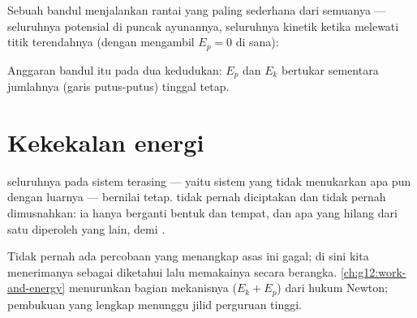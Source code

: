 Sebuah bandul menjalankan rantai yang paling sederhana dari semuanya
--- seluruhnya potensial di puncak ayunannya, seluruhnya kinetik ketika
melewati titik terendahnya (dengan mengambil $E_p = 0$ di sana):

\begin{omfigure}
\qquad
{}

{\small Anggaran bandul itu pada dua kedudukan: $E_p$ dan $E_k$
bertukar sementara jumlahnya (garis putus-putus) tinggal tetap.}
\end{omfigure}

\section{Kekekalan energi}

\begin{theorem}\label{thm:g10:energy-conservation:conservation}
 seluruhnya pada sistem terasing --- yaitu sistem yang tidak
menukarkan apa pun dengan luarnya --- bernilai tetap.  tidak
pernah diciptakan dan tidak pernah dimusnahkan: ia hanya berganti
bentuk dan tempat, dan apa yang hilang dari satu  diperoleh
 yang lain,  demi .
\end{theorem}
\admitted

\begin{remark}\label{rem:g10:energy-conservation:admitted}
Tidak pernah ada percobaan yang menangkap asas ini gagal; di sini kita
menerimanya sebagai diketahui lalu memakainya secara berangka.
\cref{ch:g12:work-and-energy} menurunkan bagian mekanisnya
($E_k + E_p$) dari hukum Newton; pembukuan yang lengkap menunggu jilid
perguruan tinggi.
\end{remark}

